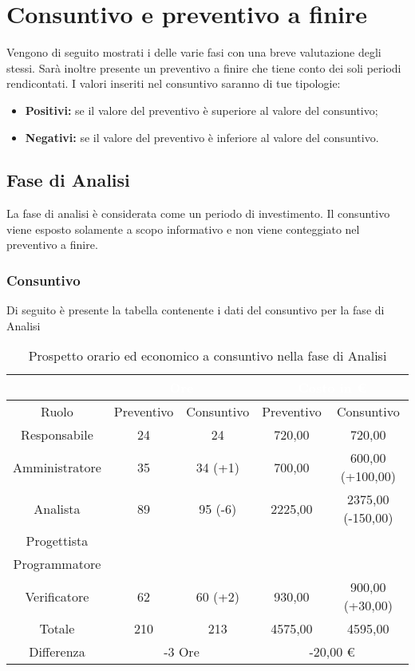\section{Consuntivo e preventivo a finire}
\label{consuntivo_preventivo_a_finire}
Vengono di seguito mostrati i  delle varie fasi con una breve valutazione degli stessi. Sarà inoltre presente un preventivo a finire che tiene conto dei soli periodi rendicontati. I valori inseriti nel consuntivo saranno di tue tipologie:
\begin {itemize}
	\item \textbf{Positivi:} se il valore del preventivo è superiore al valore del consuntivo;
	\item \textbf{Negativi:} se il valore del preventivo è inferiore al valore del consuntivo.
\end{itemize}
\subsection{Fase di Analisi}
La fase di analisi è considerata come un periodo di investimento. Il consuntivo viene esposto solamente a scopo informativo e non viene conteggiato nel preventivo a finire.
\subsubsection{Consuntivo}
Di seguito è presente la tabella contenente i dati del consuntivo per la fase di Analisi
\begin{table}[H]
	\centering
	\begin{tabular}{|c|c|c|c|c|}
	\rowcolor{darkblue} 
	 	 			&	\multicolumn{2}{c|}{\textcolor{white}{Ore}} 		& 	\multicolumn{2}{c|}{\textcolor{white}{Costo in €}}  \\ \hline
			Ruolo		&	Preventivo	&	Consuntivo	&	Preventivo	&	Consuntivo 	\\ \hline
		Responsabile		&	24		&	24		&	720,00	&	720,00  	\\ \hline
		Amministratore	&	35		&	34 (+1)	&	700,00	&	600,00 (+100,00)  \\ \hline
		Analista		&	89		&	95 (-6)	&	2225,00	&	2375,00 (-150,00)  \\ \hline
		Progettista		& 			&	 		& 			&  			\\ \hline
		Programmatore	& 			& 			& 			&  			\\ \hline
		Verificatore		&	62		&	60 (+2)	&	930,00	&	900,00 (+30,00) 	\\ \hline
		Totale			&	210		&	213		&	4575,00	&	4595,00  	\\ \hline
		Differenza		& 	\multicolumn{2}{c|}{-3 Ore} 	& 	\multicolumn{2}{c|}{-20,00 €} 	\\ \hline
	\end{tabular}
	\caption{Prospetto orario ed economico a consuntivo nella fase di Analisi}
\end{table}
